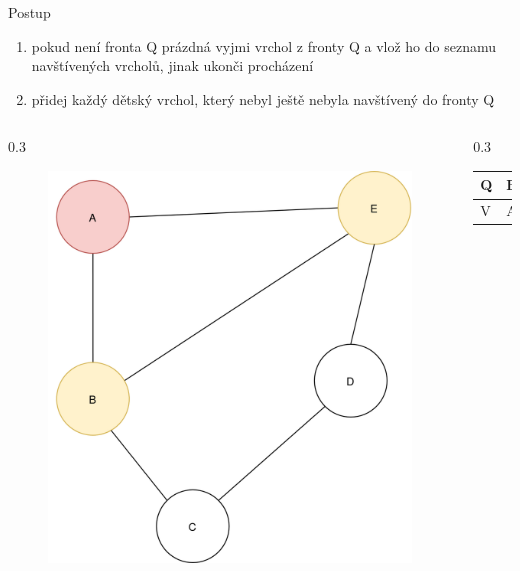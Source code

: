 \documentclass[hyperref={unicode}]{beamer}
\begin{document}
\begin{frame}
\begin{block}{Postup}
\begin{enumerate}
  [default]
    \item pokud není fronta Q prázdná vyjmi vrchol z fronty Q a vlož ho do seznamu navštívených vrcholů, jinak ukonči procházení
    \item přidej každý dětský vrchol, který nebyl ještě nebyla navštívený do fronty Q
\end{enumerate}
\end{block}
  \begin{columns}[T]
    \begin{column}{0.3\linewidth}
        \begin{figure}
        \includegraphics[width=\linewidth]{state2.png}
        \end{figure}
    \end{column}
    \begin{column}{0.3\linewidth}
    \begin{table}[]
        \begin{tabular}{|l||l|l|l|}
        \hline
        Q & B & E &  \\ \hline
        V & A &  &  \\ \hline
        \end{tabular}
\end{table}
    \end{column}
  \end{columns}
\end{frame}
\end{document}
